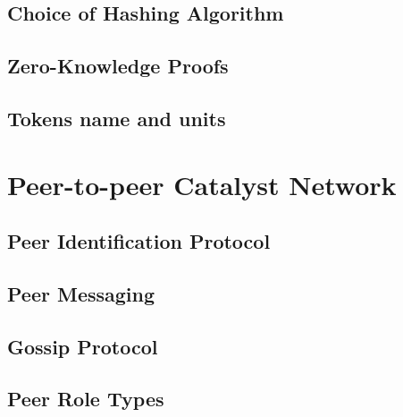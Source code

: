 \documentclass[a4paper, 12pt]{book}
\begin{document}
\section{Choice of Hashing Algorithm}\label{Sec:Has}



\section{Zero-Knowledge Proofs}\label{Sec:ZKP}



\section{Tokens name and units}\label{Sec:Tok}






\chapter{Peer-to-peer Catalyst Network} \label{Cha:NAPI}



\section{Peer Identification Protocol}\label{Sec:PIP}



\section{Peer Messaging}



\section{Gossip Protocol}



\section{Peer Role Types}\label{Sec:PRT}

\end{document}
